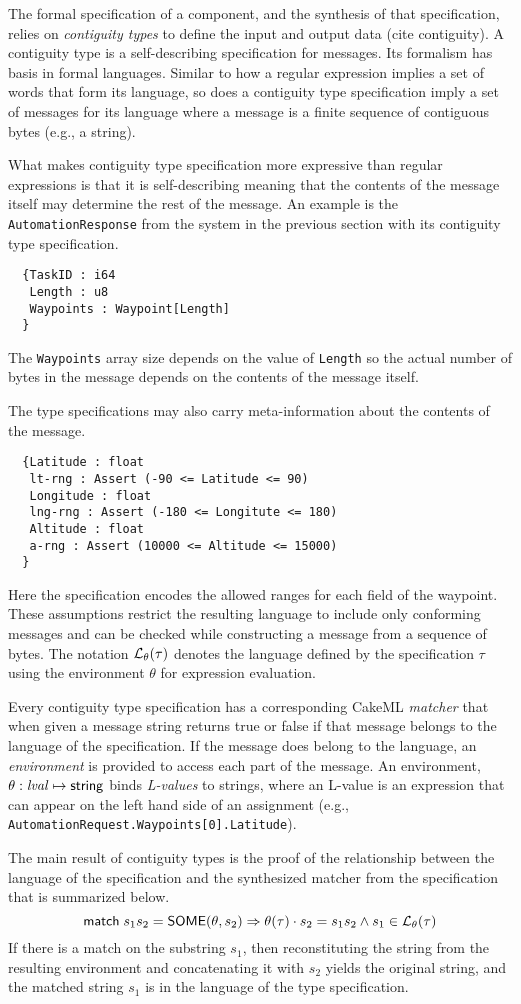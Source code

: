 The formal specification of a component, and the synthesis of that specification, relies on \emph{contiguity types} to define the input and output data (cite contiguity). A contiguity type is a self-describing specification for messages. Its formalism has basis in formal languages. Similar to how a regular expression implies a set of words that form its language, so does a contiguity type specification imply a set of messages for its language where a message is a finite sequence of contiguous bytes (e.g., a string). 

What makes contiguity type specification more expressive than regular expressions is that it is self-describing meaning that the contents of the message itself may determine the rest of the message. An example is the \texttt{AutomationResponse} from the system in the previous section with its contiguity type specification.
{\small
\begin{verbatim}
  {TaskID : i64
   Length : u8
   Waypoints : Waypoint[Length]
  }
\end{verbatim}
}
\noindent The \texttt{Waypoints} array size depends on the value of \texttt{Length} so the actual number of bytes in the message depends on the contents of the message itself. 

The type specifications may also carry meta-information about the contents of the message.
{\small
\begin{verbatim}
  {Latitude : float
   lt-rng : Assert (-90 <= Latitude <= 90) 
   Longitude : float
   lng-rng : Assert (-180 <= Longitute <= 180)
   Altitude : float
   a-rng : Assert (10000 <= Altitude <= 15000)
  }
\end{verbatim}
}
\noindent Here the specification encodes the allowed ranges for each field of the waypoint. These assumptions restrict the resulting language to include only conforming messages and can be checked while constructing a message from a sequence of bytes. The notation ${\mathcal L}_{\theta}({\tau})$ denotes the language defined by the specification $\tau$ using the environment $\theta$ for expression evaluation.

Every contiguity type specification has a corresponding CakeML \emph{matcher} that when given a message string returns true or false if that message belongs to the language of the specification. If the message does belong to the language, an \emph{environment} is provided to access each part of the message. An environment, $\theta: \mathit{lval} \mapsto \mathsf{string}$ binds \emph{L-values} to strings, where an L-value is an expression that can appear on the left hand side of an assignment (e.g., \texttt{AutomationRequest.Waypoints[0].Latitude}). 

The main result of contiguity types is the proof of the relationship between the language of the specification and the synthesized matcher from the specification that is summarized below.
\[
  \mathsf{match}\; s_1s_2 = \mathsf{SOME}(\theta, s_2)
  \Rightarrow \theta(\tau) \cdot s_2 = s_1s_2 \wedge s_1 \in {\mathcal L}_{\theta}({\tau})
\]
If there is a match on the substring $s_1$, then reconstituting the string from the resulting environment and concatenating it with $s_2$ yields the original string, and the matched string $s_1$ is in the language of the type specification. 